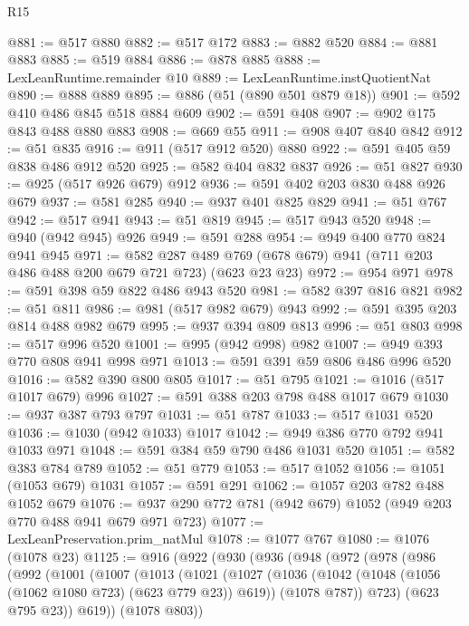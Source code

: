 \begin{lexlean}{R15}
\begin{coremodule}
@881 := @517 @880
@882 := @517 @172
@883 := @882 @520
@884 := @881 @883
@885 := @519 @884
@886 := @878 @885
@888 := LexLeanRuntime.remainder @10
@889 := LexLeanRuntime.instQuotientNat
@890 := @888 @889
@895 := @886 (@51 (@890 @501 @879 @18))
@901 := @592 @410 @486 @845 @518 @884 @609
@902 := @591 @408
@907 := @902 @175 @843 @488 @880 @883
@908 := @669 @55
@911 := @908 @407 @840 @842
@912 := @51 @835
@916 := @911 (@517 @912 @520) @880
@922 := @591 @405 @59 @838 @486 @912 @520
@925 := @582 @404 @832 @837
@926 := @51 @827
@930 := @925 (@517 @926 @679) @912
@936 := @591 @402 @203 @830 @488 @926 @679
@937 := @581 @285
@940 := @937 @401 @825 @829
@941 := @51 @767
@942 := @517 @941
@943 := @51 @819
@945 := @517 @943 @520
@948 := @940 (@942 @945) @926
@949 := @591 @288
@954 := @949 @400 @770 @824 @941 @945
@971 := @582
    @287
    @489
    @769
    (@678 @679)
    @941
    (@711 @203 @486 @488 @200 @679 @721 @723)
    (@623 @23 @23)
@972 := @954 @971
@978 := @591 @398 @59 @822 @486 @943 @520
@981 := @582 @397 @816 @821
@982 := @51 @811
@986 := @981 (@517 @982 @679) @943
@992 := @591 @395 @203 @814 @488 @982 @679
@995 := @937 @394 @809 @813
@996 := @51 @803
@998 := @517 @996 @520
@1001 := @995 (@942 @998) @982
@1007 := @949 @393 @770 @808 @941 @998 @971
@1013 := @591 @391 @59 @806 @486 @996 @520
@1016 := @582 @390 @800 @805
@1017 := @51 @795
@1021 := @1016 (@517 @1017 @679) @996
@1027 := @591 @388 @203 @798 @488 @1017 @679
@1030 := @937 @387 @793 @797
@1031 := @51 @787
@1033 := @517 @1031 @520
@1036 := @1030 (@942 @1033) @1017
@1042 := @949 @386 @770 @792 @941 @1033 @971
@1048 := @591 @384 @59 @790 @486 @1031 @520
@1051 := @582 @383 @784 @789
@1052 := @51 @779
@1053 := @517 @1052
@1056 := @1051 (@1053 @679) @1031
@1057 := @591 @291
@1062 := @1057 @203 @782 @488 @1052 @679
@1076 := @937 @290 @772 @781 (@942 @679) @1052 (@949 @203 @770 @488 @941 @679 @971 @723)
@1077 := LexLeanPreservation.prim_natMul
@1078 := @1077 @767
@1080 := @1076 (@1078 @23)
@1125 := @916
    (@922
      (@930
        (@936
          (@948
            (@972
              (@978
                (@986
                  (@992
                    (@1001
                      (@1007
                        (@1013
                          (@1021
                            (@1027
                              (@1036
                                (@1042 (@1048 (@1056 (@1062 @1080 @723) (@623 @779 @23)) @619))
                                (@1078 @787))
                              @723)
                            (@623 @795 @23))
                          @619))
                      (@1078 @803))

\end{coremodule}
\end{lexlean}
